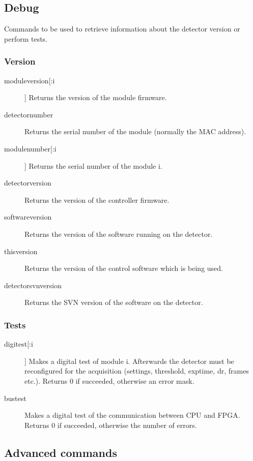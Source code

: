 \documentclass{article}
\begin{document}
\subsection{Debug}
Commands to be used to retrieve information about the detector version or perform tests.
\subsubsection{Version}
\begin{description}
\item[moduleversion[:i]]   Returns the version of the module firmware.
\item[detectornumber]  Returns the serial number of the module (normally the MAC address).
\item[modulenumber[:i]]    Returns the serial number of the module i.
\item[detectorversion]  Returns the version of the controller firmware.
\item[softwareversion] Returns the version of the software running on the detector.
\item[thisversion]  Returns the version of the control software which is being used.
\item[detectorsvnversion] Returns the SVN version of the software on the detector.
\end{description}

\subsubsection{Tests}

\begin{description}  
\item[digitest[:i]] Makes a digital test of module i.  Afterwards the detector must be reconfigured for the acquisition (settings, threshold, exptime, dr, frames etc.). Returns 0 if succeeded, otherwise an error mask.
\item[bustest] Makes a digital test of the communication between CPU and FPGA. Returns 0 if succeeded, otherwise the number of errors.
\end{description}



\subsection{Advanced commands}
\end{document}

